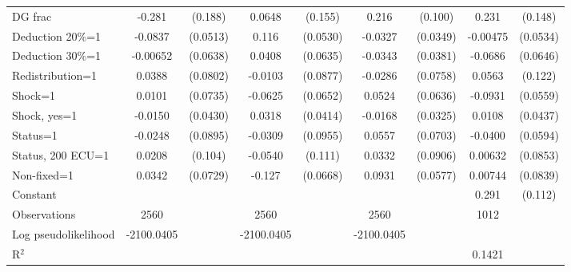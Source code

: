 \begin{tabular}{l|cccccc|cc}
DG frac         &   -0.281         &  (0.188)&   0.0648         &  (0.155)&    0.216\sym{**} &  (0.100)&    0.231         &  (0.148)\\
Deduction 20\%=1&  -0.0837         & (0.0513)&    0.116\sym{**} & (0.0530)&  -0.0327         & (0.0349)& -0.00475         & (0.0534)\\
Deduction 30\%=1& -0.00652         & (0.0638)&   0.0408         & (0.0635)&  -0.0343         & (0.0381)&  -0.0686         & (0.0646)\\
Redistribution=1&   0.0388         & (0.0802)&  -0.0103         & (0.0877)&  -0.0286         & (0.0758)&   0.0563         &  (0.122)\\
Shock=1         &   0.0101         & (0.0735)&  -0.0625         & (0.0652)&   0.0524         & (0.0636)&  -0.0931\sym{*}  & (0.0559)\\
Shock, yes=1    &  -0.0150         & (0.0430)&   0.0318         & (0.0414)&  -0.0168         & (0.0325)&   0.0108         & (0.0437)\\
Status=1        &  -0.0248         & (0.0895)&  -0.0309         & (0.0955)&   0.0557         & (0.0703)&  -0.0400         & (0.0594)\\
Status, 200 ECU=1&   0.0208         &  (0.104)&  -0.0540         &  (0.111)&   0.0332         & (0.0906)&  0.00632         & (0.0853)\\
Non-fixed=1     &   0.0342         & (0.0729)&   -0.127\sym{*}  & (0.0668)&   0.0931         & (0.0577)&  0.00744         & (0.0839)\\
Constant        &                  &         &                  &         &                  &         &    0.291\sym{**} &  (0.112)\\
\hline
Observations    &     2560         &         &     2560         &         &     2560         &         &     1012         &         \\
Log pseudolikelihood  &  -2100.0405   &         &       -2100.0405            &         &         -2100.0405          &         &           &   \\ 
R$^2$      &                  &         &                  &         &                  &         &       0.1421   &   \\ 


\end{tabular}
